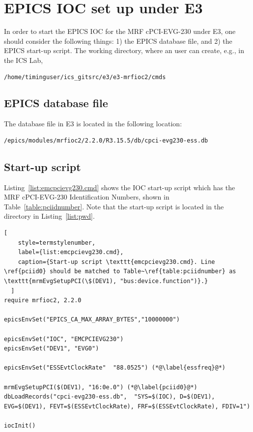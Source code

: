 \documentclass[11pt
  , a4paper
  , article
  , oneside
  , showtrims
]{memoir}
\begin{document}
\clearpage
\section{EPICS IOC set up under E3}
In order to start the EPICS IOC for the MRF cPCI-EVG-230 under E3, one should consider the following things: 1) the EPICS database file, and 2) the EPICS start-up script. The working directory, where an user can create, e.g., in the ICS Lab,
\begin{lstlisting}[style=termstyle, label={list:pwd}, caption={Working Directory in the ICS lab.} ]
/home/timinguser/ics_gitsrc/e3/e3-mrfioc2/cmds
\end{lstlisting}

\subsection{EPICS database file}
The database file in E3 is located in the following location:
\begin{lstlisting}[style=termstyle]
/epics/modules/mrfioc2/2.2.0/R3.15.5/db/cpci-evg230-ess.db
\end{lstlisting}


\subsection{Start-up script}
Listing~\ref{list:emcpcievg230.cmd} shows the IOC start-up script which has the MRF cPCI-EVG-230 Identification Numbers, shown in Table~\ref{table:pciidnumber}. Note that the start-up script is located in the directory in Listing~\ref{list:pwd}.

\begin{lstlisting}[
    style=termstylenumber,
    label={list:emcpcievg230.cmd},
    caption={Start-up script \texttt{emcpcievg230.cmd}. Line \ref{pciid0} should be matched to Table~\ref{table:pciidnumber} as \texttt{mrmEvgSetupPCI(\$(DEV1), "bus:device.function")}.}
  ]
require mrfioc2, 2.2.0

epicsEnvSet("EPICS_CA_MAX_ARRAY_BYTES","10000000")

epicsEnvSet("IOC", "EMCPCIEVG230")
epicsEnvSet("DEV1", "EVG0")

epicsEnvSet("ESSEvtClockRate"  "88.0525") (*@\label{essfreq}@*)

mrmEvgSetupPCI($(DEV1), "16:0e.0") (*@\label{pciid0}@*)
dbLoadRecords("cpci-evg230-ess.db",  "SYS=$(IOC), D=$(DEV1), EVG=$(DEV1), FEVT=$(ESSEvtClockRate), FRF=$(ESSEvtClockRate), FDIV=1")

iocInit()
\end{lstlisting}
\end{document}

